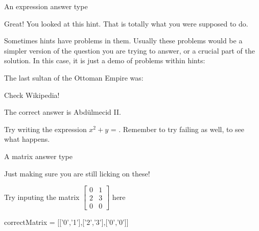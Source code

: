 \documentclass{ximera}
\begin{document}
\begin{problem}
	An expression answer type
	\begin{solution}
		\begin{hint}
			Great!  You looked at this hint.  That is totally what you were supposed to do.
		\end{hint}
		\begin{hint}
			Sometimes hints have problems in them.  Usually these problems would be a simpler version of the question you are trying to answer,
			or a crucial part of the solution.  In this case, it is just a demo of problems within hints:
				\begin{question}
					The last sultan of the Ottoman Empire was:
						\begin{solution}
							\begin{hint}
								Check Wikipedia!
							\end{hint}
							\begin{hint}
								The correct answer is Abdülmecid II.
							\end{hint}
							\begin{multiple-choice}
							\end{multiple-choice}
						\end{solution}
				\end{question}
		\end{hint}
		Try writing the expression $x^2+y$ = .  Remember to try failing as well, to see what happens.
	\end{solution}
\end{problem}

\begin{problem}
	A matrix answer type
	\begin{solution}
		\begin{hint}
			Just making sure you are still licking on these!
		\end{hint}
		Try inputing the matrix $\begin{bmatrix}  0&1\\2&3\\0&0\end{bmatrix}$ here
			\begin{matrix-answer}[name=M]
				correctMatrix = [['0','1'],['2','3'],['0','0']]
			\end{matrix-answer}
	\end{solution}
\end{problem}
\end{document}
